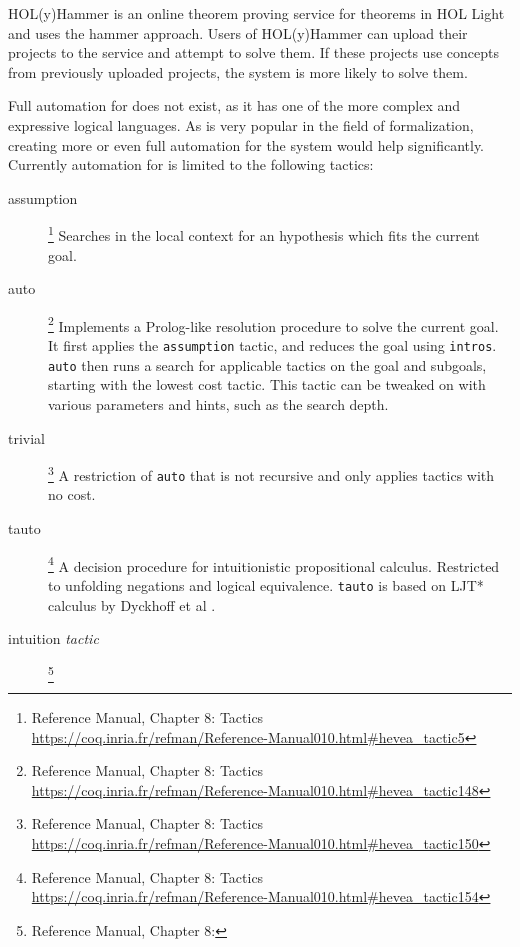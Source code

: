 HOL(y)Hammer \cite{kaliszyk2013hol} is an online theorem proving service for theorems in HOL Light and uses the hammer approach.
Users of HOL(y)Hammer can upload their projects to the service and attempt to solve them.
If these projects use concepts from previously uploaded projects, the system is more likely to solve them.

Full automation for \coq does not exist, as it has one of the more complex and expressive logical languages.
As \coq is very popular in the field of formalization, creating more or even full automation for the system would help significantly.
Currently automation for \coq is limited to the following tactics:
\begin{description}
\item[assumption]
  \footnote{
    \coq Reference Manual, Chapter 8:
    Tactics\\
    \url{https://coq.inria.fr/refman/Reference-Manual010.html\#hevea_tactic5}
  }
  Searches in the local context for an hypothesis which fits the current goal.
\item[auto]
  \footnote{
    \coq Reference Manual, Chapter 8:
    Tactics\\
    \url{https://coq.inria.fr/refman/Reference-Manual010.html\#hevea_tactic148}
  }
  Implements a Prolog-like resolution procedure to solve the current goal.
  It first applies the \texttt{assumption} tactic, and reduces the goal using \texttt{intros}.
  \texttt{auto} then runs a search for applicable tactics on the goal and subgoals, starting with the lowest cost tactic.
  This tactic can be tweaked on with various parameters and hints, such as the search depth.
\item[trivial]
  \footnote{
    \coq Reference Manual, Chapter 8:
    Tactics\\
    \url{https://coq.inria.fr/refman/Reference-Manual010.html\#hevea_tactic150}
  }
  A restriction of \texttt{auto} that is not recursive and only applies tactics with no cost.
\item[tauto]
  \footnote{
    \coq Reference Manual, Chapter 8:
    Tactics\\
    \url{https://coq.inria.fr/refman/Reference-Manual010.html\#hevea_tactic154}
  }
  A decision procedure for intuitionistic propositional calculus.
  Restricted to unfolding negations and logical equivalence.
  \texttt{tauto} is based on LJT* calculus by Dyckhoff et al \cite{dyckhoff1992contraction}.
\item[intuition \emph{tactic}]
  \footnote{
    \coq Reference Manual, Chapter 8:
}
\end{description}
